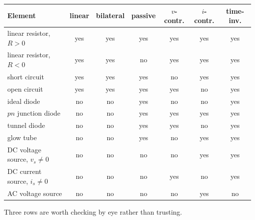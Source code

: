 \documentclass[11pt,a4paper]{article}
\begin{document}
\begin{center}
\small
\renewcommand{\arraystretch}{1.25}
\begin{tabular}{@{}l c c c c c c@{}}
\toprule
\textbf{Element} & \textbf{linear} & \textbf{bilateral} & \textbf{passive} &
\textbf{$v$-contr.} & \textbf{$i$-contr.} & \textbf{time-inv.}\\
\midrule
linear resistor, $R>0$        & yes & yes & yes & yes & yes & yes\\
linear resistor, $R<0$        & yes & yes & \textcolor{metured}{no}  & yes & yes & yes\\
short circuit                 & yes & yes & yes & \textcolor{metured}{no}  & yes & yes\\
open circuit                  & yes & yes & yes & yes & \textcolor{metured}{no}  & yes\\
ideal diode                   & \textcolor{metured}{no}  & \textcolor{metured}{no}  & yes & \textcolor{metured}{no}  & \textcolor{metured}{no}  & yes\\
$pn$ junction diode           & \textcolor{metured}{no}  & \textcolor{metured}{no}  & yes & yes & yes & yes\\
tunnel diode                  & \textcolor{metured}{no}  & \textcolor{metured}{no}  & yes & yes & \textcolor{metured}{no}  & yes\\
glow tube                     & \textcolor{metured}{no}  & \textcolor{metured}{no}  & yes & \textcolor{metured}{no}  & yes & yes\\
DC voltage source, $v_s\neq0$ & \textcolor{metured}{no}  & \textcolor{metured}{no}  & \textcolor{metured}{no}  & \textcolor{metured}{no}  & yes & yes\\
DC current source, $i_s\neq0$ & \textcolor{metured}{no}  & \textcolor{metured}{no}  & \textcolor{metured}{no}  & yes & \textcolor{metured}{no}  & yes\\
AC voltage source             & \textcolor{metured}{no}  & \textcolor{metured}{no}  & \textcolor{metured}{no}  & \textcolor{metured}{no}  & yes & \textcolor{metured}{no}\\
\bottomrule
\end{tabular}
\end{center}

Three rows are worth checking by eye rather than trusting.
\end{document}
